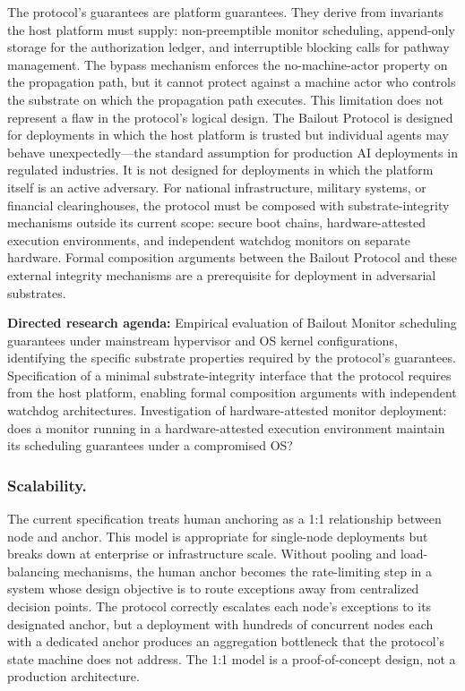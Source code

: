 The protocol's guarantees are platform guarantees. They derive from invariants the host platform must supply: non-preemptible monitor scheduling, append-only storage for the authorization ledger, and interruptible blocking calls for pathway management. The bypass mechanism enforces the no-machine-actor property on the propagation path, but it cannot protect against a machine actor who controls the substrate on which the propagation path executes. This limitation does not represent a flaw in the protocol's logical design. The Bailout Protocol is designed for deployments in which the host platform is trusted but individual agents may behave unexpectedly---the standard assumption for production AI deployments in regulated industries. It is not designed for deployments in which the platform itself is an active adversary. For national infrastructure, military systems, or financial clearinghouses, the protocol must be composed with substrate-integrity mechanisms outside its current scope: secure boot chains, hardware-attested execution environments, and independent watchdog monitors on separate hardware. Formal composition arguments between the Bailout Protocol and these external integrity mechanisms are a prerequisite for deployment in adversarial substrates.

\textbf{Directed research agenda:} Empirical evaluation of Bailout Monitor scheduling guarantees under mainstream hypervisor and OS kernel configurations, identifying the specific substrate properties required by the protocol's guarantees. Specification of a minimal substrate-integrity interface that the protocol requires from the host platform, enabling formal composition arguments with independent watchdog architectures. Investigation of hardware-attested monitor deployment: does a monitor running in a hardware-attested execution environment maintain its scheduling guarantees under a compromised OS?

\subsubsection{Scalability.}\label{sec:lim-scalability}

The current specification treats human anchoring as a 1:1 relationship between node and anchor. This model is appropriate for single-node deployments but breaks down at enterprise or infrastructure scale. Without pooling and load-balancing mechanisms, the human anchor becomes the rate-limiting step in a system whose design objective is to route exceptions away from centralized decision points. The protocol correctly escalates each node's exceptions to its designated anchor, but a deployment with hundreds of concurrent nodes each with a dedicated anchor produces an aggregation bottleneck that the protocol's state machine does not address. The 1:1 model is a proof-of-concept design, not a production architecture.

